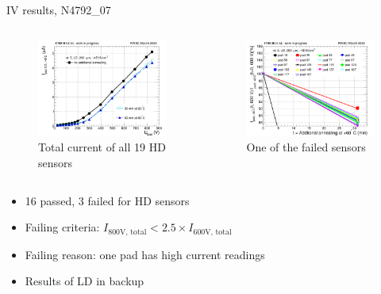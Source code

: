 \documentclass{beamer}
\begin{document}
\begin{frame}{IV results, N4792\_07}
  \begin{columns}
       \begin{figure}
           \includegraphics[width=1.0\textwidth]{plots/annealing_IV_ch101_N4792_7.png}
           \caption{Total current of all 19 HD sensors}
       \end{figure}

       \begin{figure}
           \includegraphics[width=1.0\textwidth]{plots/annealing_current_N4792_7.png}
           \caption{One of the failed sensors}
       \end{figure}

   \end{columns}

   \begin{itemize}
       \item \alert{16 passed}, \alert{3 failed} for HD sensors
       \item Failing criteria:  $I_\text{800V, total} < 2.5 \times I_\text{600V, total}$
       \item Failing reason: one pad has high current readings
       \item Results of LD in backup
   \end{itemize}
\end{frame}
\end{document}
